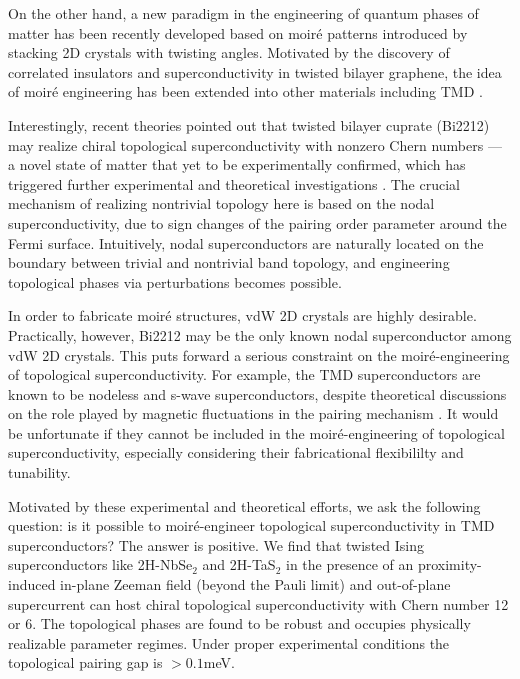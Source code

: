 On the other hand, a new paradigm in the engineering of quantum phases of matter has been recently developed based on moir\'{e} patterns \cite{cao2018correlated,cao2018unconventional,bistritzer2011moire} introduced by stacking 2D crystals with twisting angles. Motivated by the discovery of correlated insulators and superconductivity in twisted bilayer graphene, the idea of moir\'{e} engineering has been extended into other materials including TMD \cite{li2021imaging,devakul2021magic,angeli2021gamma,wu2019topological}. 

Interestingly, recent theories pointed out that twisted bilayer cuprate (Bi2212) may realize chiral topological superconductivity with nonzero Chern numbers \cite{can2021high,song2021doping,zhao2021emergent} --- a novel state of matter that yet to be experimentally confirmed, which has triggered further experimental and theoretical investigations \cite{volkov2020magic,volkov2021josephson}. The crucial mechanism of realizing nontrivial topology here is based on the nodal superconductivity, due to sign changes of the pairing order parameter around the Fermi surface. Intuitively, nodal superconductors are naturally located on the boundary between trivial and nontrivial band topology, and engineering topological phases via perturbations becomes possible. 

In order to fabricate moir\'{e} structures, vdW 2D crystals are highly desirable. Practically, however, Bi2212 may be the only known nodal superconductor among vdW 2D crystals. This puts forward a serious constraint on the moir\'{e}-engineering of topological superconductivity. For example, the TMD superconductors are known to be nodeless and s-wave superconductors, despite theoretical discussions on the role played by magnetic fluctuations in the pairing mechanism \cite{shaffer2020crystalline}. It would be unfortunate if they cannot be included in the moir\'{e}-engineering of topological superconductivity, especially considering their fabricational flexibililty and tunability.

Motivated by these experimental and theoretical efforts, we ask the following question: is it possible to moir\'{e}-engineer topological superconductivity in TMD superconductors? The answer is positive. We find that twisted Ising superconductors like 2H-NbSe$_2$ and 2H-TaS$_2$ in the presence of an proximity-induced in-plane Zeeman field (beyond the Pauli limit) and out-of-plane supercurrent can host chiral topological superconductivity with Chern number 12 or 6. The topological phases are found to be robust and occupies physically realizable parameter regimes. Under proper experimental conditions the topological pairing gap is $>0.1$meV.

